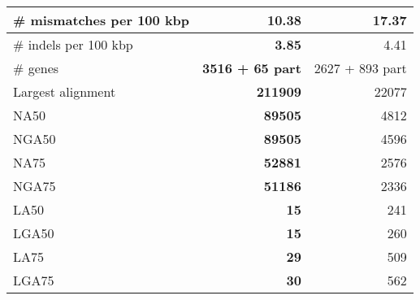 \documentclass[12pt,a4paper]{article}
\begin{document}
\begin{table}[ht]
\begin{center}
\begin{tabular}{|l*{2}{|r}|}
\# mismatches per 100 kbp & {\bf 10.38} & 17.37 \\ \hline
\# indels per 100 kbp & {\bf 3.85} & 4.41 \\ \hline
\# genes & {\bf 3516 + 65 part} & 2627 + 893 part \\ \hline
Largest alignment & {\bf 211909} & 22077 \\ \hline
NA50 & {\bf 89505} & 4812 \\ \hline
NGA50 & {\bf 89505} & 4596 \\ \hline
NA75 & {\bf 52881} & 2576 \\ \hline
NGA75 & {\bf 51186} & 2336 \\ \hline
LA50 & {\bf 15} & 241 \\ \hline
LGA50 & {\bf 15} & 260 \\ \hline
LA75 & {\bf 29} & 509 \\ \hline
LGA75 & {\bf 30} & 562 \\ \hline
\end{tabular}
\end{center}
\end{table}
\end{document}
